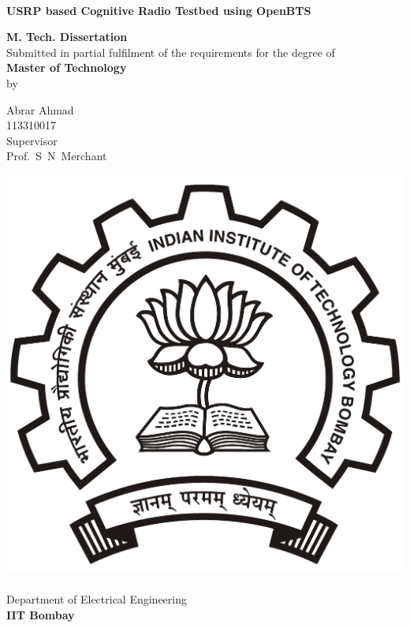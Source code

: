 \begin{titlepage}
\begin{center}
\begin{spacing}{1.0}


~\\[0.3cm]
{ \LARGE \bfseries USRP based Cognitive Radio Testbed using OpenBTS\\[1.2cm] }

\textbf{\large M. Tech. Dissertation}\\[1.2cm]

{Submitted in partial fulfilment of the requirements for the degree of\\[0.1cm]
\textbf{Master of Technology}\\[0.3cm]
by\\[0.3cm]}

{\LARGE Abrar Ahmad\\[0.1cm]}
{113310017\\[1.4cm]}
{Supervisor\\[0.1cm]}
{\LARGE Prof.~S~N~Merchant\\[2cm]}

\includegraphics[width=0.21\textheight]{../images/iitbLogo}~\\[0.9cm]
Department of Electrical Engineering\\[0.2cm]
\textbf{\large IIT Bombay}\\[1.3cm]


\end{spacing}
\end{center}
\end{titlepage}
